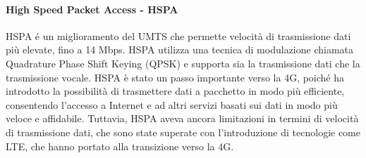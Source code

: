 \paragraph{High Speed Packet Access - HSPA}
HSPA é un miglioramento del UMTS che permette velocità di trasmissione dati più elevate, fino a 14 Mbps. HSPA utilizza una tecnica di modulazione chiamata Quadrature Phase Shift Keying (QPSK) e supporta sia la trasmissione dati che la trasmissione vocale. HSPA è stato un passo importante verso la 4G, poiché ha introdotto la possibilità di trasmettere dati a pacchetto in modo più efficiente, consentendo l'accesso a Internet e ad altri servizi basati sui dati in modo più veloce e affidabile. Tuttavia, HSPA aveva ancora limitazioni in termini di velocità di trasmissione dati, che sono state superate con l'introduzione di tecnologie come LTE, che hanno portato alla transizione verso la 4G.\\
